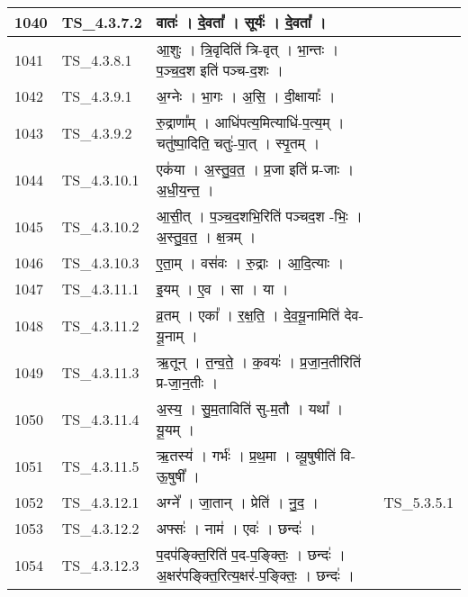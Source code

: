 \documentclass[17pt]{extarticle}
\begin{document}
\begin{longtable}{||p{0.4in}||p{0.9in}||p{4.0in}||p{0.9in}||}
        \hline
            1040 & TS\_4.3.7.2 & वातः॑   ।   दे॒वता᳚   ।   सूर्यः॑   ।   दे॒वता᳚   ।    &      \\
        \hline
            1041 & TS\_4.3.8.1 & आ॒शुः   ।   त्रि॒वृदिति॑ त्रि{-}वृत्   ।   भा॒न्तः   ।   प॒ञ्च॒द॒श इति॑ पञ्च{-}द॒शः   ।    &      \\
        \hline
            1042 & TS\_4.3.9.1 & अ॒ग्नेः   ।   भा॒गः   ।   अ॒सि॒   ।   दी॒क्षायाः᳚   ।    &      \\
        \hline
            1043 & TS\_4.3.9.2 & रु॒द्राणा᳚म्   ।   आधि॑पत्य॒मित्याधि॑{-}प॒त्य॒म्   ।   चतु॑ष्पा॒दिति॒ चतुः॑{-}पा॒त्   ।   स्पृ॒तम्   ।    &      \\
        \hline
            1044 & TS\_4.3.10.1 & एक॑या   ।   अ॒स्तु॒व॒त॒   ।   प्र॒जा इति॑ प्र{-}जाः   ।   अ॒धी॒य॒न्त॒   ।    &      \\
        \hline
            1045 & TS\_4.3.10.2 & आ॒सी॒त्   ।   प॒ञ्च॒द॒शभि॒रिति॑ पञ्चद॒श {-}भिः॒   ।   अ॒स्तु॒व॒त॒   ।   क्ष॒त्रम्   ।    &      \\
        \hline
            1046 & TS\_4.3.10.3 & ए॒ता॒म्   ।   वस॑वः   ।   रु॒द्राः   ।   आ॒दि॒त्याः   ।    &      \\
        \hline
            1047 & TS\_4.3.11.1 & इ॒यम्   ।   ए॒व   ।   सा   ।   या   ।    &      \\
        \hline
            1048 & TS\_4.3.11.2 & व्र॒तम्   ।   एका᳚   ।   र॒क्ष॒ति॒   ।   दे॒व॒यू॒नामिति॑ देव{-}यू॒नाम्   ।    &      \\
        \hline
            1049 & TS\_4.3.11.3 & ऋ॒तून्   ।   त॒न्व॒ते॒   ।   क॒वयः॑   ।   प्र॒जा॒न॒तीरिति॑ प्र{-}जा॒न॒तीः   ।    &      \\
        \hline
            1050 & TS\_4.3.11.4 & अ॒स्य॒   ।   सु॒म॒ताविति॑ सु{-}म॒तौ   ।   यथा᳚   ।   यू॒यम्   ।    &      \\
        \hline
            1051 & TS\_4.3.11.5 & ऋ॒तस्य॑   ।   गर्भः॑   ।   प्र॒थ॒मा   ।   व्यू॒षुषीति॑ वि{-}ऊ॒षुषी᳚   ।    &      \\
        \hline
            1052 & TS\_4.3.12.1 & अग्ने᳚   ।   जा॒तान्   ।   प्रेति॑   ।   नु॒द॒   ।    &  TS\_5.3.5.1       \\
        \hline
            1053 & TS\_4.3.12.2 & अफ्सः॑   ।   नाम॑   ।   एवः॑   ।   छन्दः॑   ।    &      \\
        \hline
            1054 & TS\_4.3.12.3 & प॒दप॑ङ्क्ति॒रिति॑ प॒द{-}प॒ङ्क्तिः॒   ।   छन्दः॑   ।   अ॒क्षर॑पङ्क्ति॒रित्य॒क्षर॑{-}प॒ङ्क्तिः॒   ।   छन्दः॑   ।    &      \\
        \hline

\end{longtable}
\end{document}

